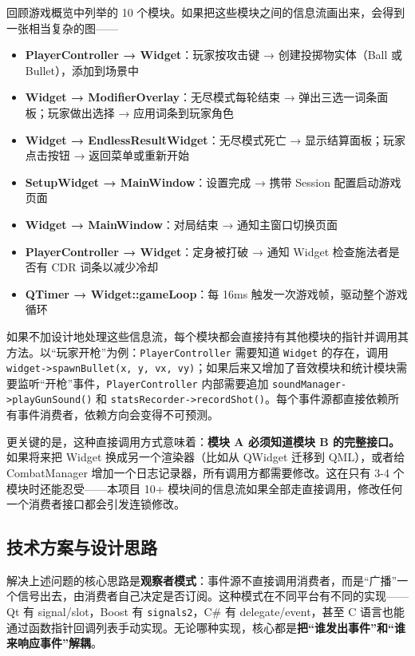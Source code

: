 \documentclass[utf8]{ctexart}
\begin{document}
回顾游戏概览中列举的 10 个模块。如果把这些模块之间的信息流画出来，会得到一张相当复杂的图——

\begin{itemize}
  \item \textbf{PlayerController → Widget}：玩家按攻击键 → 创建投掷物实体（Ball 或 Bullet），添加到场景中
  \item \textbf{Widget → ModifierOverlay}：无尽模式每轮结束 → 弹出三选一词条面板；玩家做出选择 → 应用词条到玩家角色
  \item \textbf{Widget → EndlessResultWidget}：无尽模式死亡 → 显示结算面板；玩家点击按钮 → 返回菜单或重新开始
  \item \textbf{SetupWidget → MainWindow}：设置完成 → 携带 Session 配置启动游戏页面
  \item \textbf{Widget → MainWindow}：对局结束 → 通知主窗口切换页面
  \item \textbf{PlayerController → Widget}：定身被打破 → 通知 Widget 检查施法者是否有 CDR 词条以减少冷却
  \item \textbf{QTimer → Widget::gameLoop}：每 16ms 触发一次游戏帧，驱动整个游戏循环
\end{itemize}

如果不加设计地处理这些信息流，每个模块都会直接持有其他模块的指针并调用其方法。以“玩家开枪”为例：\texttt{PlayerController} 需要知道 \texttt{Widget} 的存在，调用 \texttt{widget->spawnBullet(x, y, vx, vy)}；如果后来又增加了音效模块和统计模块需要监听“开枪”事件，\texttt{PlayerController} 内部需要追加 \texttt{soundManager->playGunSound()} 和 \texttt{statsRecorder->recordShot()}。每个事件源都直接依赖所有事件消费者，依赖方向会变得不可预测。

更关键的是，这种直接调用方式意味着：\textbf{模块 A 必须知道模块 B 的完整接口。}如果将来把 Widget 换成另一个渲染器（比如从 QWidget 迁移到 QML），或者给 CombatManager 增加一个日志记录器，所有调用方都需要修改。这在只有 3-4 个模块时还能忍受——本项目 10+ 模块间的信息流如果全部走直接调用，修改任何一个消费者接口都会引发连锁修改。

\subsection{技术方案与设计思路}

解决上述问题的核心思路是\textbf{观察者模式}：事件源不直接调用消费者，而是“广播”一个信号出去，由消费者自己决定是否订阅。这种模式在不同平台有不同的实现——Qt 有 signal/slot，Boost 有 \texttt{signals2}，C\# 有 delegate/event，甚至 C 语言也能通过函数指针回调列表手动实现。无论哪种实现，核心都是\textbf{把“谁发出事件”和“谁来响应事件”解耦}。
\end{document}
